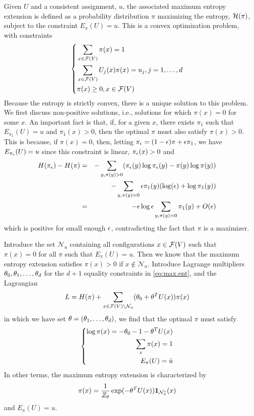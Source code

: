 Given $U$ and a consistent assignment, $u$,   the associated maximum
entropy extension is defined as a probability distribution $\pi$
maximizing the entropy, ${\mathcal H}(\pi)$, subject to the constraint $E_\pi(U)
= u$. This is a convex optimization problem, with constraints
\begin{equation}
\label{eq:max.ent}
\left\{
\begin{aligned}
&\sum_{x\in {\mathcal F}(V)} \pi(x) = 1 \\
&\sum_{x\in {\mathcal F}(V)} U_j(x) \pi(x) = u_j, j=1, \ldots, d\\
&\pi(x) \geq 0, x\in {\mathcal F}(V)
\end{aligned}\right. 
\end{equation}
Because the entropy is strictly convex, there is a unique solution to
this problem. We first discuss non-positive solutions, i.e., solutions
for which $\pi(x) = 0$ for some $x$. An important fact is that, if,
for a given $x$, there exists $\pi_1$ such that $E_{\pi_1}(U) = u$ and
$\pi_1(x) > 0$, then the optimal $\pi$ must also satisfy $\pi(x) >
0$. This is because, if $\pi(x) = 0$, then, letting $\pi_\epsilon = (1-\epsilon)
\pi + \epsilon \pi_1$, we have $E_{\pi_\epsilon}(U) = u$ since this constraint
is linear, $\pi_\epsilon(x) > 0$ and
\begin{eqnarray*}
H(\pi_\epsilon) - H(\pi) &=& -\sum_{y, \pi(y) > 0} (\pi_\epsilon(y) \log\pi_\epsilon(y)
- \pi(y) \log\pi(y)) \\
&&-\sum_{y, \pi(y) = 0} \epsilon \pi_1(y) (\log(\epsilon) + \log \pi_1(y)) \\
&=& -\epsilon \log\epsilon \sum_{y, \pi(y) =0} \pi_1(y) + O(\epsilon)
\end{eqnarray*}
which is positive for small enough $\epsilon$, contradicting the fact that
$\pi$ is a maximizer. 

Introduce the set $\mathcal N_u$ containing all configurations $x\in
{\mathcal F}(V)$ such that $\pi(x)=0$ for all $\pi$ such that $E_\pi(U) = u$. Then
we know that the maximum entropy extension satisfies $\pi(x) > 0$
if $x\not\in \mathcal N_u$. Introduce Lagrange multipliers $\theta_0, \theta_1, \ldots, \theta_d$ for the
$d+1$ equality constraints in \cref{eq:max.ent}, and the Lagrangian
\[
L = H(\pi) +  \sum_{x\in {\mathcal F}(V)\setminus {\mathcal N}_u} (\theta_0 +
\theta^TU(x))\pi(x) 
\]
in which we have set $\theta = (\theta_1, \ldots, \theta_d)$, we find that the
optimal $\pi$ must satisfy
\[
\left\{
\begin{aligned}
\log \pi(x) = -\theta_0 - 1 -\theta^TU(x)\\
\sum_x \pi(x) = 1 \\
E_{\pi}(U) = \bar u\\
\end{aligned}
\right.
\]
In other terms, the maximum entropy extension is characterized by
\[
\pi(x) = \frac{1}{Z_\theta} \exp(-\theta^T U(x)){\bm 1}_{{\mathcal N}_u^c}(x)
\]
and $E_\pi(U) = u$. 

